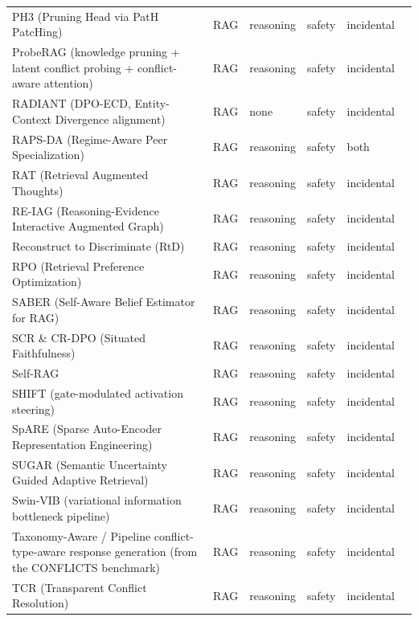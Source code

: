\begin{longtable}{@{}>{\raggedright\arraybackslash}p{}lllll@{}}
PH3 (Pruning Head via PatH PatcHing) & RAG & reasoning & safety & incidental & \cite{jin-2024-cutting} \\
ProbeRAG (knowledge pruning + latent conflict probing + conflict-aware attention) & RAG & reasoning & safety & incidental & \cite{gao-2025-blackbox} \\
RADIANT (DPO-ECD, Entity-Context Divergence alignment) & RAG & none & safety & incidental & \cite{rawte-2025-radiant} \\
RAPS-DA (Regime-Aware Peer Specialization) & RAG & reasoning & safety & both & \cite{wang-2026-regimeaware} \\
RAT (Retrieval Augmented Thoughts) & RAG & reasoning & safety & incidental & \cite{wang-2024-rat} \\
RE-IAG (Reasoning-Evidence Interactive Augmented Graph) & RAG & reasoning & safety & incidental & \cite{sui-2026-decomposition} \\
Reconstruct to Discriminate (RtD) & RAG & reasoning & safety & incidental & \cite{peng-2025-misinformation} \\
RPO (Retrieval Preference Optimization) & RAG & reasoning & safety & incidental & \cite{yan-2025-rpo} \\
SABER (Self-Aware Belief Estimator for RAG) & RAG & reasoning & safety & incidental & \cite{zhu-2026-trust} \\
SCR \& CR-DPO (Situated Faithfulness) & RAG & reasoning & safety & incidental & \cite{huang-2024-trust} \\
Self-RAG & RAG & reasoning & safety & incidental & \cite{asai-2023-selfrag} \\
SHIFT (gate-modulated activation steering) & RAG & reasoning & safety & incidental & \cite{li-2026-shift} \\
SpARE (Sparse Auto-Encoder Representation Engineering) & RAG & reasoning & safety & incidental & \cite{zhao-2024-steering} \\
SUGAR (Semantic Uncertainty Guided Adaptive Retrieval) & RAG & reasoning & safety & incidental & \cite{zubkova-2025-sugar} \\
Swin-VIB (variational information bottleneck pipeline) & RAG & reasoning & safety & incidental & \cite{wang-2025-accommodate} \\
Taxonomy-Aware / Pipeline conflict-type-aware response generation (from the CONFLICTS benchmark) & RAG & reasoning & safety & incidental & \cite{cattan-2025-dragged} \\
TCR (Transparent Conflict Resolution) & RAG & reasoning & safety & incidental & \cite{ye-2026-seeing} \\

\end{longtable}
